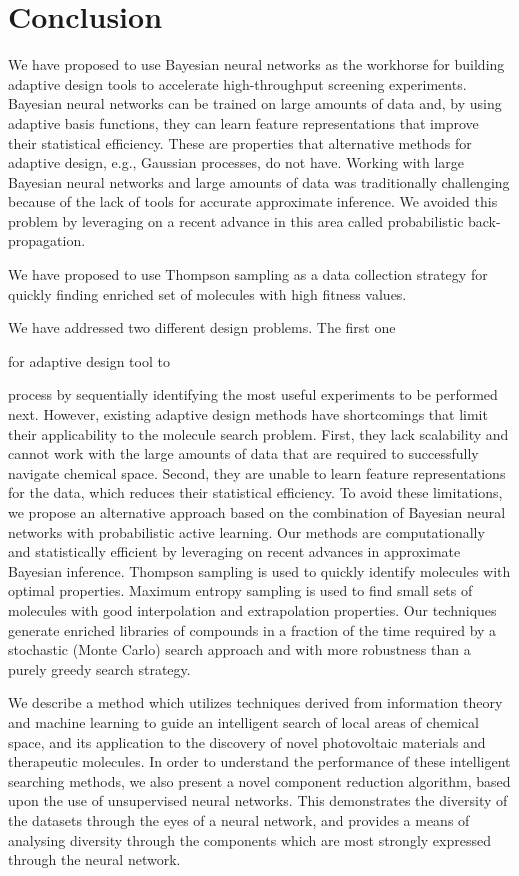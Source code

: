 \section{Conclusion}

We have proposed to use Bayesian neural networks as the workhorse for building adaptive design tools to accelerate high-throughput screening experiments. Bayesian neural networks can be trained on large amounts of data and, by using adaptive basis functions, they can learn feature representations that improve their statistical efficiency. These are properties that alternative methods for adaptive design, e.g., Gaussian processes, do not have. Working with large Bayesian neural networks and large amounts of data was traditionally challenging because of the lack of tools for accurate approximate inference. We avoided this problem by leveraging on a recent advance in this area called probabilistic back-propagation.

We have proposed to use Thompson sampling as a data collection strategy for quickly finding enriched set of molecules with high fitness values.

We have addressed two different design problems. The first one

for adaptive design tool to


process by sequentially identifying the most useful experiments to be performed
next. However, existing adaptive design methods have shortcomings that limit
their applicability to the molecule search problem. First, they lack
scalability and cannot work with the large amounts of data that are required to
successfully navigate chemical space. Second, they are unable to learn feature
representations for the data, which reduces their statistical efficiency. To
avoid these limitations, we propose an alternative approach based on the
combination of Bayesian neural networks with probabilistic active learning. Our
methods are computationally and statistically efficient by leveraging on recent
advances in approximate Bayesian inference. Thompson
sampling is used to quickly identify molecules with optimal properties.
Maximum entropy sampling is used
to find small sets of molecules with good interpolation and extrapolation properties.
Our techniques generate enriched libraries of compounds in a fraction
of the time required by a stochastic (Monte Carlo) search approach and with
more robustness than a purely greedy search strategy.

We describe a method which utilizes techniques derived from information theory and machine learning to guide an intelligent search of local areas of chemical space, and its application to the discovery of novel photovoltaic materials and therapeutic molecules.  In order to understand the performance of these intelligent searching methods, we also present a novel component reduction algorithm, based upon the use of unsupervised neural networks.  This demonstrates the diversity of the datasets through the eyes of a neural network, and provides a means of analysing diversity through the components which are most strongly expressed through the neural network.  


